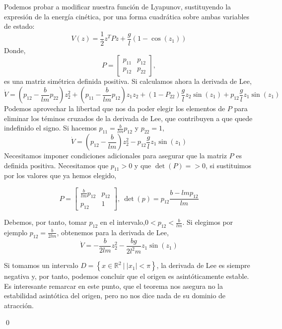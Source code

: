 \begin{example}
Podemos probar a modificar nuestra función de Lyapunov, sustituyendo la expresión de la energía cinética, por una forma cuadrática sobre ambas variables de estado:
\begin{equation*}
V(z) = \frac{1}{2} z^TPz+ \frac{g}{l}\left(1-\cos(z_1)\right)
\end{equation*}
Donde,
\begin{equation*}
P = \begin{bmatrix}
p_{11} & p_{12}\\ p_{12} & p_{22}
\end{bmatrix},
\end{equation*}
es una matriz simétrica definida positiva.
Si calculamos ahora la derivada de Lee,
\begin{equation*}
\dot V =\left(p_{12}-\frac{b}{lm}p_{22}\right)z_2^2+ \left(p_{11}-\frac{b}{lm}p_{12} \right) z_1z_2 + (1 -P_{22})\frac{g}{l} z_2\sin(z_1) + p_{12}\frac{g}{l} z_1\sin(z_1)
\end{equation*}
Podemos aprovechar la libertad que nos da poder elegir los elementos de $P$ para eliminar los téminos cruzados de la derivada de Lee, que contribuyen a que quede indefinido el signo. Si hacemos $p_{11} = \frac{b}{lm}p_{12}$ y $p_{22}=1$,
\begin{equation*}
\dot V =\left(p_{12}-\frac{b}{lm}\right)z_2^2-p_{12}\frac{g}{l} z_1\sin(z_1)
\end{equation*}
Necesitamos imponer condiciones adicionales  para asegurar que la matriz $P$ es definida positiva. Necesitamos que $p_{11}>0$ y que $\det(P) = >0$, si sustituimos por los valores que ya hemos elegido,

\begin{equation*}
P =\begin{bmatrix}
\frac{b}{lm}p_{12} & p_{12}\\
p_{12} & 1
\end{bmatrix}, \ \det(p) = p_{12}\frac{b-lmp_{12}}{lm}
\end{equation*}

Debemos, por tanto, tomar $p_{12}$ en el intervalo,$0<p_{12}< \frac{b}{lm}$. Si elegimos por ejemplo $p_{12} =  \frac{b}{2lm}$, obtenemos para la derivada de Lee,
\begin{equation*}
\dot V =-\frac{b}{2lm}z_2^2-\frac{bg}{2l^2m}z_1 \sin(z_1)
\end{equation*}

Si tomamos un intervalo $D=\left\{x \in \mathbb{R}^2 \ | \ |x_1|<\pi \right\}$, la derivada de Lee es siempre negativa y, por tanto, podemos concluir que el origen es asintóticamente estable. Es interesante remarcar en este punto, que el teorema nos asegura no la estabilidad asintótica del origen, pero no nos dice nada de su dominio de atracción.

\qed
\end{example}


